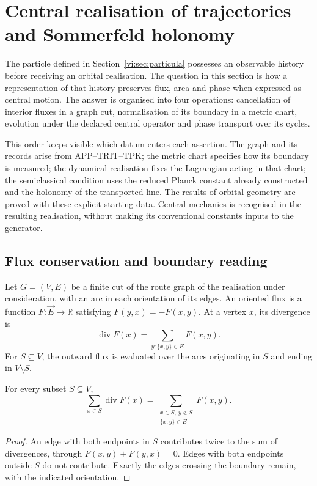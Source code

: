 \section{Central realisation of trajectories and Sommerfeld holonomy}
\label{vi:sec:kepler}

The particle defined in Section~\ref{vi:sec:particula} possesses
an observable history before receiving an orbital realisation.
The question in this section is how a representation of that
history preserves flux, area and phase when expressed as
central motion. The answer is organised into four operations:
cancellation of interior fluxes in a graph cut,
normalisation of its boundary in a metric chart, evolution under
the declared central operator and phase transport over its cycles.

This order keeps visible which datum enters each assertion.
The graph and its records arise from APP--TRIT--TPK; the metric
chart specifies how its boundary is measured; the dynamical realisation
fixes the Lagrangian acting in that chart; the semiclassical condition
uses the reduced Planck constant already constructed and the holonomy
of the transported line. The results of orbital geometry are
proved with these explicit starting data. Central
mechanics is recognised in the resulting realisation, without making its
conventional constants inputs to the generator.

\subsection{Flux conservation and boundary reading}
\label{vi:subsec:gauss}

Let $G=(V,E)$ be a finite cut of the route graph of the
realisation under consideration, with an arc in each orientation of its
edges. An oriented flux is a function
$F:\vec E\to\mathbb R$ satisfying
$F(y,x)=-F(x,y)$. At a vertex $x$, its divergence is
\begin{equation}
 \operatorname{div}F(x)
 =\sum_{y:\{x,y\}\in E}F(x,y).
 \label{vi:eq:divergencia-grafo}
\end{equation}
For $S\subseteq V$, the outward flux is evaluated over the
arcs originating in $S$ and ending in $V\setminus S$.

\begin{theorem}
\label{vi:thm:gauss}
For every subset $S\subseteq V$,
\begin{equation}
 \sum_{x\in S}\operatorname{div}F(x)
 =\sum_{\substack{x\in S,\ y\notin S\\\{x,y\}\in E}}F(x,y).
 \label{vi:eq:gauss}
\end{equation}
\end{theorem}
\begin{proof}
An edge with both endpoints in $S$ contributes twice to the
sum of divergences, through $F(x,y)+F(y,x)=0$. Edges
with both endpoints outside $S$ do not contribute. Exactly
the edges crossing the boundary remain, with the
indicated orientation.
\end{proof}

